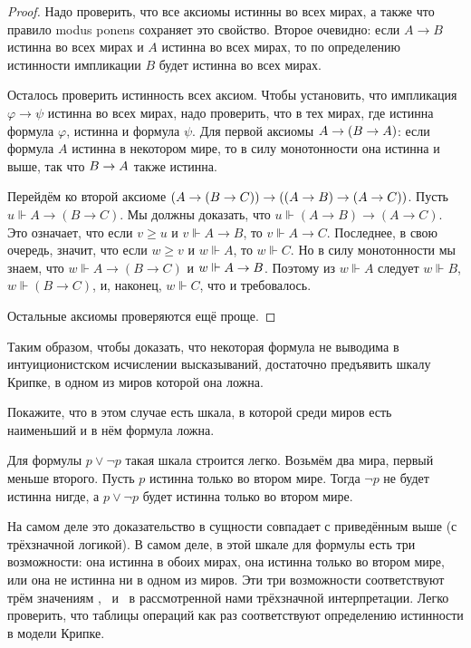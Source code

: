 \begin{proof}
Надо проверить, что все аксиомы истинны во всех мирах,
а также что правило modus ponens%
%
сохраняет это свойство.
Второе очевидно: если $A\to B$ истинна во всех мирах и $A$
истинна во всех мирах, то по определению истинности импликации
$B$ будет истинна во всех мирах.

Осталось проверить истинность всех аксиом. Чтобы установить,
что импликация $\varphi\to\psi$ истинна во всех мирах,
надо проверить, что в тех мирах, где истинна формула $\varphi$,
истинна и формула $\psi$. Для первой аксиомы $A\hm\to (B\to A)$:
если формула $A$ истинна в некотором мире, то в силу монотонности
она истинна и выше, так что $B\hm\to A$ также истинна.

Перейдём ко второй аксиоме $(A\hm\to(B\hm\to C))\hm\to((A\hm\to
B)\hm\to (A\hm\to C))$. Пусть $u\Vdash A\to(B\to C)$. Мы должны
доказать, что $u\Vdash (A\to B)\to(A\to C)$. Это
означает, что если $v\ge u$ и $v\Vdash A\to B$, то $v\Vdash A\to
C$. Последнее, в свою очередь, значит, что если $w\ge v$ и
$w\Vdash A$, то $w\Vdash C$. Но в силу монотонности мы знаем,
что ${w\Vdash A\to(B\to C)}$ и $w\Vdash A\hm\to B$. Поэтому из
$w\Vdash A$ следует $w\Vdash B$, $w\Vdash (B\to C)$, и, наконец,
$w\Vdash C$, что и требовалось.

Остальные аксиомы проверяются ещё проще.
\end{proof}

Таким образом, чтобы доказать, что некоторая формула не
выводима в интуиционистском исчислении высказываний,
достаточно предъявить шкалу Крипке, в одном из миров
которой она ложна.

\begin{problem}
Покажите, что в этом случае есть шкала, в которой
среди миров есть наименьший и в нём формула ложна.
\end{problem}

Для формулы $p\lor \lnot p$ такая шкала строится легко. Возьмём
два мира, первый меньше второго. Пусть $p$ истинна только во
втором мире. Тогда $\lnot p$ не будет истинна нигде, а $p\lor
\lnot p$ будет истинна только во втором мире.

На самом деле это доказательство в сущности совпадает с
приведённым выше (с трёхзначной логикой). В самом деле, в этой
шкале для формулы есть три возможности: она истинна в обоих
мирах, она истинна только во втором мире, или она не истинна ни
в одном из миров. Эти три возможности соответствуют трём
значениям \И, \Н\ и \Л\ в рассмотренной нами трёхзначной
интерпретации. Легко проверить, что таблицы операций как раз
соответствуют определению истинности в модели Крипке.

